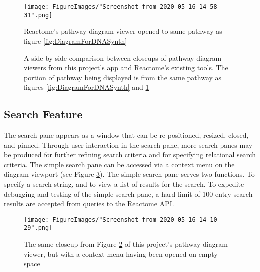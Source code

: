 \documentclass[12pt]{report}
\begin{document}
\begin{figure}[b!]
	\begin{center}
		\texttt{[image: FigureImages/"Screenshot from 2020-05-16 14-58-31".png]}
	\end{center}
	\caption{Reactome's pathway diagram viewer opened to same pathway as figure \ref{fig:DiagramForDNASynth}}
	
	\label{fig:ReactomesDiagramForDNASynth}
\end{figure}

\newpage

\begin{figure}[h]
	\begin{center}
	\end{center}
	\caption{A side-by-side comparison between closeups of pathway diagram viewers from this project's app and Reactome's existing tools. The portion of pathway being displayed is from the same pathway as figures \ref{fig:DiagramForDNASynth} and \ref{fig:ReactomesDiagramForDNASynth}}
	
	\label{fig:ReactomeVsProjectVisualComparison}
\end{figure}
\newpage

\subsection{Search Feature}
The search pane appears as a window that can be re-positioned, resized, closed, and pinned. Through user interaction in the search pane, more search panes may be produced for further refining search criteria and for specifying relational search criteria. The simple search pane can be accessed via a context menu on the diagram viewport (see Figure \ref{fig:ContextMenuOpened}). The simple search pane serves two functions. To specify a search string, and to view a list of results for the search. To expedite debugging and testing of the simple search pane, a hard limit of 100 entry search results are accepted from queries to the Reactome API.

\begin{figure}[h!]
	\begin{center}
		\texttt{[image: FigureImages/"Screenshot from 2020-05-16 14-10-29".png]}
	\end{center}
	\caption{The same closeup from Figure \ref{fig:ReactomeVsProjectVisualComparison} of this project's pathway diagram viewer, but with a context menu having been opened on empty space}
	\label{fig:ContextMenuOpened}
\end{figure}
\end{document}
